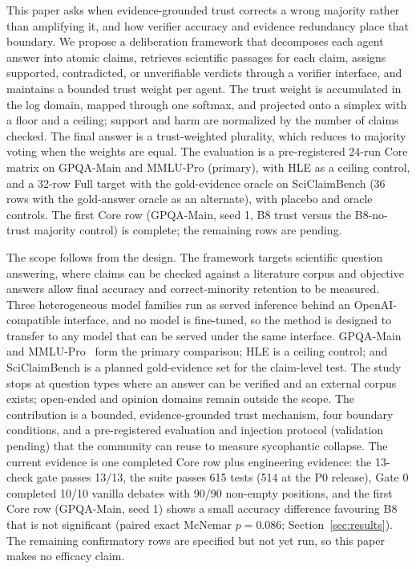 \documentclass[a4paper,fleqn]{cas-sc}
\begin{document}
This paper asks when evidence-grounded trust corrects a wrong majority rather than amplifying it, and how verifier accuracy and evidence redundancy place that boundary. We propose a deliberation framework that decomposes each agent answer into atomic claims, retrieves scientific passages for each claim, assigns supported, contradicted, or unverifiable verdicts through a verifier interface, and maintains a bounded trust weight per agent. The trust weight is accumulated in the log domain, mapped through one softmax, and projected onto a simplex with a floor and a ceiling; support and harm are normalized by the number of claims checked. The final answer is a trust-weighted plurality, which reduces to majority voting when the weights are equal. The evaluation is a pre-registered 24-run Core matrix on GPQA-Main and MMLU-Pro (primary), with HLE as a ceiling control, and a 32-row Full target with the gold-evidence oracle on SciClaimBench (36 rows with the gold-answer oracle as an alternate), with placebo and oracle controls. The first Core row (GPQA-Main, seed 1, B8 trust versus the B8-no-trust majority control) is complete; the remaining rows are pending.

The scope follows from the design. The framework targets scientific question answering, where claims can be checked against a literature corpus and objective answers allow final accuracy and correct-minority retention to be measured. Three heterogeneous model families run as served inference behind an OpenAI-compatible interface, and no model is fine-tuned, so the method is designed to transfer to any model that can be served under the same interface. GPQA-Main~\cite{rein2024gpqa} and MMLU-Pro~\cite{wang2024mmlupro} form the primary comparison; HLE is a ceiling control; and SciClaimBench is a planned gold-evidence set for the claim-level test. The study stops at question types where an answer can be verified and an external corpus exists; open-ended and opinion domains remain outside the scope. The contribution is a bounded, evidence-grounded trust mechanism, four boundary conditions, and a pre-registered evaluation and injection protocol (validation pending) that the community can reuse to measure sycophantic collapse. The current evidence is one completed Core row plus engineering evidence: the 13-check gate passes 13/13, the suite passes 615 tests (514 at the P0 release), Gate 0 completed 10/10 vanilla debates with 90/90 non-empty positions, and the first Core row (GPQA-Main, seed 1) shows a small accuracy difference favouring B8 that is not significant (paired exact McNemar $p=0.086$; Section~\ref{sec:results}). The remaining confirmatory rows are specified but not yet run, so this paper makes no efficacy claim.
\end{document}
